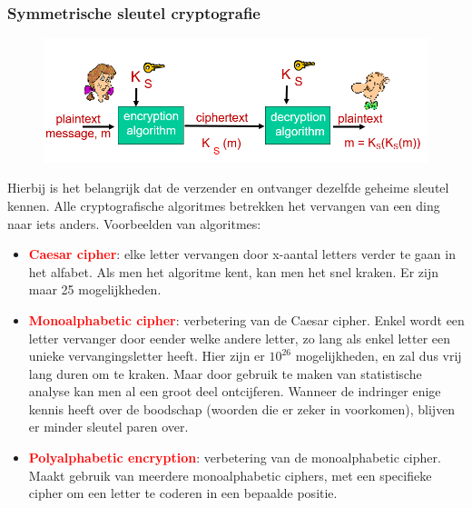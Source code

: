 \subsubsection{Symmetrische sleutel cryptografie}

\begin{figure}[h]
    \centering
    \includegraphics[width=7in]{./img/imghfdst8/hfdst8puntje3.png}\\[1cm]
    \caption{ }      
    \label{fig: }
\end{figure}


Hierbij is het belangrijk dat de verzender en ontvanger dezelfde geheime sleutel kennen.
Alle cryptografische algoritmes betrekken het vervangen van een ding naar iets anders.
Voorbeelden van algoritmes:
\begin{itemize}
    \item \textcolor{red}{\textbf{Caesar cipher}}: elke letter vervangen door x-aantal letters verder te gaan in het alfabet. Als men het algoritme kent, kan men het snel kraken. Er zijn maar 25 mogelijkheden.
    \item \textcolor{red}{\textbf{Monoalphabetic cipher}}: verbetering van de Caesar cipher. Enkel wordt een letter vervanger door eender welke andere letter, zo lang als enkel letter een unieke vervangingsletter heeft. Hier zijn er $10^{26}$ mogelijkheden, en zal dus vrij lang duren om te kraken. Maar door gebruik te maken van statistische analyse kan men al een groot deel ontcijferen. Wanneer de indringer enige kennis heeft over de boodschap (woorden die er zeker in voorkomen), blijven er minder sleutel paren over.
    \item \textcolor{red}{\textbf{Polyalphabetic encryption}}: verbetering van de monoalphabetic cipher. Maakt gebruik van meerdere monoalphabetic ciphers, met een specifieke cipher om een letter te coderen in een bepaalde positie.
\end{itemize}

\clearpage


